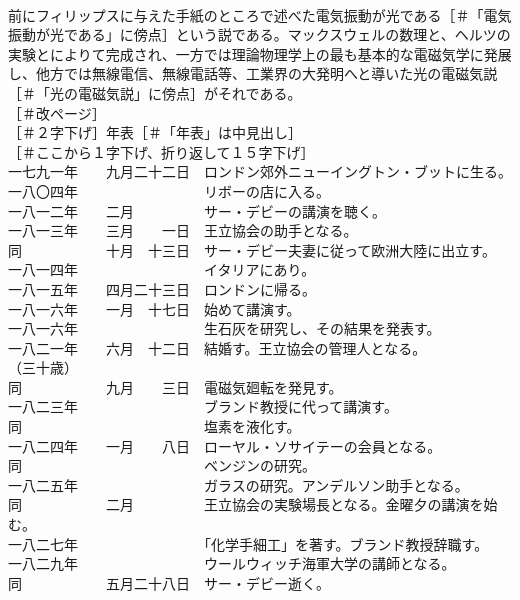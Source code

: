 \documentclass[8pt]{extreport}
\begin{document}
\begin{CJK}{UTF8}{min}
\\	前にフィリップスに与えた手紙のところで述べた電気振動が光である［＃「電気振動が光である」に傍点］という説である。マックスウェルの数理と、ヘルツの実験とによりて完成され、一方では理論物理学上の最も基本的な電磁気学に発展し、他方では無線電信、無線電話等、工業界の大発明へと導いた光の電磁気説［＃「光の電磁気説」に傍点］がそれである。
\\	［＃改ページ］
\\	［＃２字下げ］年表［＃「年表」は中見出し］
\\	［＃ここから１字下げ、折り返して１５字下げ］
\\	一七九一年　　九月二十二日　ロンドン郊外ニューイングトン・ブットに生る。
\\	一八〇四年　　　　　　　　　リボーの店に入る。
\\	一八一二年　　二月　　　　　サー・デビーの講演を聴く。
\\	一八一三年　　三月　　一日　王立協会の助手となる。
\\	同　　　　　　十月　十三日　サー・デビー夫妻に従って欧洲大陸に出立す。
\\	一八一四年　　　　　　　　　イタリアにあり。
\\	一八一五年　　四月二十三日　ロンドンに帰る。
\\	一八一六年　　一月　十七日　始めて講演す。
\\	一八一六年　　　　　　　　　生石灰を研究し、その結果を発表す。
\\	一八二一年　　六月　十二日　結婚す。王立協会の管理人となる。
\\	（三十歳）
\\	同　　　　　　九月　　三日　電磁気廻転を発見す。
\\	一八二三年　　　　　　　　　ブランド教授に代って講演す。
\\	同　　　　　　　　　　　　　塩素を液化す。
\\	一八二四年　　一月　　八日　ローヤル・ソサイテーの会員となる。
\\	同　　　　　　　　　　　　　ベンジンの研究。
\\	一八二五年　　　　　　　　　ガラスの研究。アンデルソン助手となる。
\\	同　　　　　　二月　　　　　王立協会の実験場長となる。金曜夕の講演を始む。
\\	一八二七年　　　　　　　　　「化学手細工」を著す。ブランド教授辞職す。
\\	一八二九年　　　　　　　　　ウールウィッチ海軍大学の講師となる。
\\	同　　　　　　五月二十八日　サー・デビー逝く。

\end{CJK}
\end{document}
